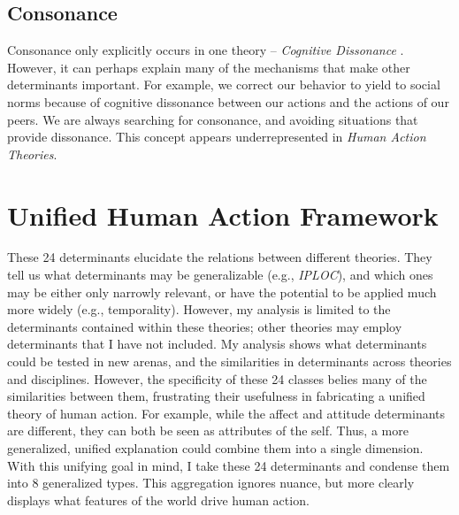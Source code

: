 \documentclass[12 pt]{article}
\begin{document}
		\subsection{Consonance}
		Consonance only explicitly occurs in one theory -- \textit{Cognitive Dissonance} \parencite{Festinger1957}. However, it can perhaps explain many of the mechanisms that make other determinants important. For example, we correct our behavior to yield to social norms because of cognitive dissonance between our actions and the actions of our peers. We are always searching for consonance, and avoiding situations that provide dissonance. This concept appears underrepresented in \textit{Human Action Theories}. 
	
 \section{Unified Human Action Framework}
 
 These 24 determinants elucidate the relations between different theories. They tell us what determinants may be generalizable (e.g., \textit{IPLOC}), and which ones may be either only narrowly relevant, or have the potential to be applied much more widely (e.g., temporality). However, my analysis is limited to the determinants contained within these theories; other theories may employ determinants that I have not included. My analysis shows what determinants could be tested in new arenas, and the similarities in determinants across theories and disciplines. However, the specificity of these 24 classes belies many of the similarities between them, frustrating their usefulness in fabricating a unified theory of human action.  For example, while the affect and attitude determinants are different, they can both be seen as attributes of the self. Thus, a more generalized, unified explanation could combine them into a single dimension. With this unifying goal in mind, I take these 24 determinants and condense them into 8 generalized types. This aggregation ignores nuance, but more clearly displays what features of the world drive human action. 
 
\end{document}
